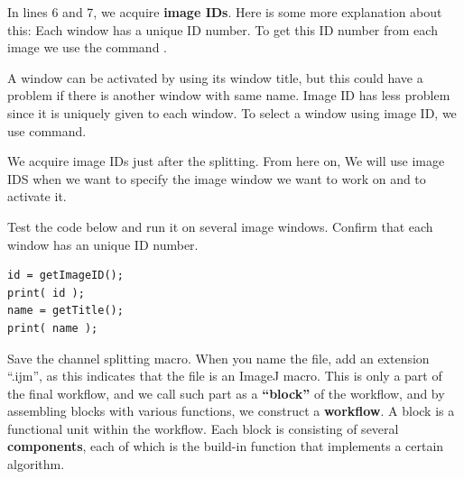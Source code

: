 In lines 6 and 7, we acquire \textbf{image IDs}. Here is some more explanation about this: Each window has a unique ID number. To get this ID number from each image we use the command .

\begin{indentCom}
\end{indentCom}

A window can be activated by  using its window title, but this could have a problem if there is another window with same name. Image ID has less problem since it is uniquely given to each window. To select a window using image ID, we use  command.

\begin{indentCom}
\end{indentCom}

We acquire image IDs just after the splitting. From here on, We will use image IDS when we want to specify the image window we want to work on and to activate it. 

\begin{indentexercise}{1}
Test the code below and run it on several image windows. Confirm that each window has an unique ID number. 
\begin{lstlisting}
id = getImageID();
print( id );
name = getTitle();
print( name );
\end{lstlisting}
\end{indentexercise}

Save the channel splitting macro. When you name the file, add an extension ``.ijm'', as this indicates that the file is an ImageJ macro. This is only a part of the final workflow, and we call such part as a \textbf{``block''} of the workflow, and by assembling blocks with various functions, we construct a \textbf{workflow}. A block is a functional unit within the workflow. Each block is consisting of several \textbf{components}, each of which is the build-in function that implements a certain algorithm.  

